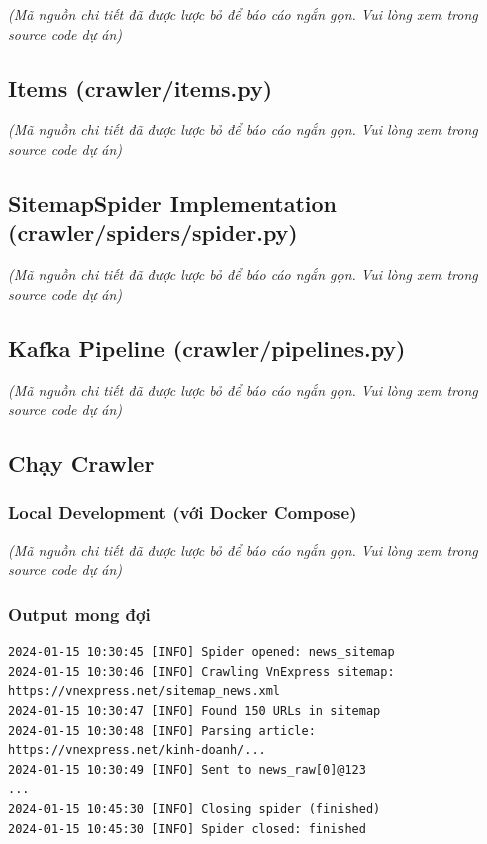 \emph{(Mã nguồn chi tiết đã được lược bỏ để báo cáo ngắn gọn. Vui lòng
xem trong source code dự án)}

\hypertarget{items-crawleritems.py}{%
\subsection{Items (crawler/items.py)}}

\emph{(Mã nguồn chi tiết đã được lược bỏ để báo cáo ngắn gọn. Vui lòng
xem trong source code dự án)}

\hypertarget{sitemapspider-implementation-crawlerspidersspider.py}{%
\subsection{SitemapSpider Implementation
(crawler/spiders/spider.py)}}

\emph{(Mã nguồn chi tiết đã được lược bỏ để báo cáo ngắn gọn. Vui lòng
xem trong source code dự án)}

\hypertarget{kafka-pipeline-crawlerpipelines.py}{%
\subsection{Kafka Pipeline
(crawler/pipelines.py)}}

\emph{(Mã nguồn chi tiết đã được lược bỏ để báo cáo ngắn gọn. Vui lòng
xem trong source code dự án)}

\hypertarget{chux1ea1y-crawler}{%
\subsection{Chạy Crawler}}

\hypertarget{local-development-vux1edbi-docker-compose}{%
\subsubsection{Local Development (với Docker
Compose)}}

\emph{(Mã nguồn chi tiết đã được lược bỏ để báo cáo ngắn gọn. Vui lòng
xem trong source code dự án)}

\hypertarget{output-mong-ux111ux1ee3i}{%
\subsubsection{Output mong đợi}}

\begin{verbatim}
2024-01-15 10:30:45 [INFO] Spider opened: news_sitemap
2024-01-15 10:30:46 [INFO] Crawling VnExpress sitemap: https://vnexpress.net/sitemap_news.xml
2024-01-15 10:30:47 [INFO] Found 150 URLs in sitemap
2024-01-15 10:30:48 [INFO] Parsing article: https://vnexpress.net/kinh-doanh/...
2024-01-15 10:30:49 [INFO] Sent to news_raw[0]@123
...
2024-01-15 10:45:30 [INFO] Closing spider (finished)
2024-01-15 10:45:30 [INFO] Spider closed: finished
\end{verbatim}

